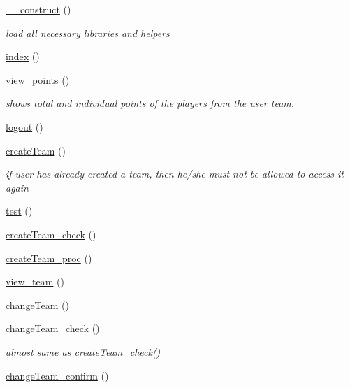\begin{DoxyCompactItemize}
\item 
\hyperlink{class_user_a095c5d389db211932136b53f25f39685}{\+\_\+\+\_\+construct} ()
\begin{DoxyCompactList}\small\item\em load all necessary libraries and helpers \end{DoxyCompactList}\item 
\hyperlink{class_user_a149eb92716c1084a935e04a8d95f7347}{index} ()
\item 
\hyperlink{class_user_a0ed4ac99a6e67e1d1395eb0a75a38f20}{view\+\_\+points} ()
\begin{DoxyCompactList}\small\item\em shows total and individual points of the players from the user team. \end{DoxyCompactList}\item 
\hyperlink{class_user_a082405d89acd6835c3a7c7a08a7adbab}{logout} ()
\item 
\hyperlink{class_user_a36a67d958d920277b1e45be6a8d0227b}{create\+Team} ()
\begin{DoxyCompactList}\small\item\em if user has already created a team, then he/she must not be allowed to access it again \end{DoxyCompactList}\item 
\hyperlink{class_user_ad69dd4607977cae05ebe19d1ae604fb1}{test} ()
\item 
\hyperlink{class_user_a9ee6ddbb1acf42844df98ffbd2f58b15}{create\+Team\+\_\+check} ()
\item 
\hyperlink{class_user_a0e374aca34aaa9dedb6b141cb4289d9d}{create\+Team\+\_\+proc} ()
\item 
\hyperlink{class_user_a0e5294ee2e4b59af701c1bd04d792957}{view\+\_\+team} ()
\item 
\hyperlink{class_user_a90610d30e7356d460391dcdd95cf542b}{change\+Team} ()
\item 
\hyperlink{class_user_a5a3e6e7b23390f8fb9d34fb1dfca3365}{change\+Team\+\_\+check} ()
\begin{DoxyCompactList}\small\item\em almost same as \hyperlink{class_user_a9ee6ddbb1acf42844df98ffbd2f58b15}{create\+Team\+\_\+check()} \end{DoxyCompactList}\item 
\hyperlink{class_user_a6fe82a0edb9a707106674f766e6651bd}{change\+Team\+\_\+confirm} ()
\item 

\end{DoxyCompactItemize}
